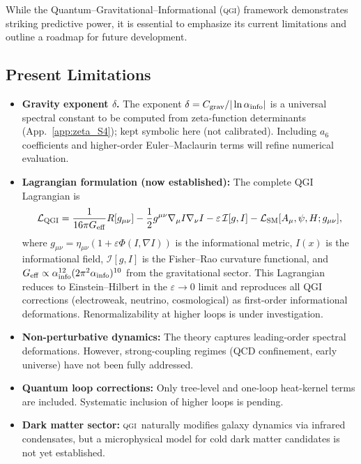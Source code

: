 \documentclass{article}
\numberwithin{equation}{section}
\theoremstyle{plain}
\theoremstyle{definition}
\theoremstyle{remark}
\newcommand{\qgi}{\textsc{qgi}}
\begin{document}
While the Quantum--Gravitational--Informational (\qgi) framework demonstrates striking predictive power, it is essential to emphasize its current limitations and outline a roadmap for future development.

\subsection{Present Limitations}
\begin{itemize}
    \item \textbf{Gravity exponent $\delta$.} The exponent $\delta = C_{\rm grav}/|\ln\alpha_{\rm info}|$ is a universal spectral constant to be computed from zeta-function determinants (App.~\ref{app:zeta_S4}); kept symbolic here (not calibrated). Including $a_6$ coefficients and higher-order Euler–Maclaurin terms will refine numerical evaluation.
    \item \textbf{Lagrangian formulation (now established):} The complete QGI Lagrangian is
    \begin{equation}
    \mathcal{L}_{\rm QGI} = \frac{1}{16\pi G_{\rm eff}} R[g_{\mu\nu}] - \frac{1}{2} g^{\mu\nu} \nabla_\mu I \nabla_\nu I - \varepsilon \, \mathcal{I}[g,I] - \mathcal{L}_{\rm SM}[A_\mu,\psi,H; g_{\mu\nu}],
    \end{equation}
    where $g_{\mu\nu} = \eta_{\mu\nu}(1 + \varepsilon \Phi(I,\nabla I))$ is the informational metric, $I(x)$ is the informational field, $\mathcal{I}[g,I]$ is the Fisher–Rao curvature functional, and $G_{\rm eff} \propto \alpha_{\rm info}^{12}(2\pi^2\alpha_{\rm info})^{10}$ from the gravitational sector. This Lagrangian reduces to Einstein–Hilbert in the $\varepsilon \to 0$ limit and reproduces all QGI corrections (electroweak, neutrino, cosmological) as first-order informational deformations. Renormalizability at higher loops is under investigation.
    \item \textbf{Non-perturbative dynamics:} The theory captures leading-order spectral deformations. However, strong-coupling regimes (QCD confinement, early universe) have not been fully addressed.
    \item \textbf{Quantum loop corrections:} Only tree-level and one-loop heat-kernel terms are included. Systematic inclusion of higher loops is pending.
    \item \textbf{Dark matter sector:} \qgi\ naturally modifies galaxy dynamics via infrared condensates, but a microphysical model for cold dark matter candidates is not yet established.
\end{itemize}
\end{document}
